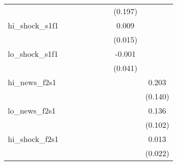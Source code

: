 {\begin{tabular}{l*{8}{c}}
            &                     &                     &                     &                     &                     &                     &     (0.197)         &                     \\
\addlinespace
hi\_shock\_s1f1&                     &                     &                     &                     &                     &                     &       0.009         &                     \\
            &                     &                     &                     &                     &                     &                     &     (0.015)         &                     \\
\addlinespace
lo\_shock\_s1f1&                     &                     &                     &                     &                     &                     &      -0.001         &                     \\
            &                     &                     &                     &                     &                     &                     &     (0.041)         &                     \\
\addlinespace
hi\_news\_f2s1&                     &                     &                     &                     &                     &                     &                     &       0.203         \\
            &                     &                     &                     &                     &                     &                     &                     &     (0.140)         \\
\addlinespace
lo\_news\_f2s1&                     &                     &                     &                     &                     &                     &                     &       0.136         \\
            &                     &                     &                     &                     &                     &                     &                     &     (0.102)         \\
\addlinespace
hi\_shock\_f2s1&                     &                     &                     &                     &                     &                     &                     &       0.013         \\
            &                     &                     &                     &                     &                     &                     &                     &     (0.022)         \\

\end{tabular}}
